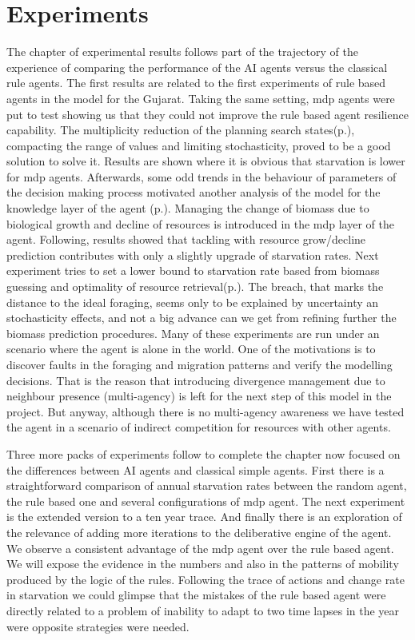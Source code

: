 \documentclass[11pt,oneside,a4paper,openright]{report}
\begin{document}
	
\chapter{Experiments}

The chapter of experimental results follows part of the trajectory of the experience of comparing the 
performance of the AI agents versus the classical rule agents. The first results are related to the first
experiments of rule based agents in the model for the Gujarat\cite{JARM2014}. Taking the same setting, 
mdp agents were put to test showing us that they could not improve the rule based agent resilience capability.  
The multiplicity reduction of the planning search states(p.\pageref{sec:ReduccStates}), compacting the range of values and 
limiting stochasticity, proved to be a good solution to solve it. Results are shown where it is obvious that 
starvation is lower for mdp agents. Afterwards, some odd trends in the behaviour of parameters of the decision 
making process motivated another analysis of the model for the knowledge layer of the agent 
(p.\pageref{sec:Divergence}). 
Managing the change of biomass due to biological growth and decline of resources is introduced in the mdp 
layer of the agent. Following, results showed that tackling with resource grow/decline prediction contributes 
with only a slightly upgrade of starvation rates. Next experiment tries to set a lower bound to starvation 
rate based from biomass guessing and optimality of resource retrieval(p.\pageref{sec:NoDepletionExperiment}). The breach, 
that marks the distance to the ideal foraging, seems only to be explained by uncertainty an stochasticity 
effects, and not a big advance can we get from refining further the biomass prediction procedures. Many of 
these experiments are run under an scenario where the agent is alone in the world. One of the motivations is 
to discover faults in the foraging and migration patterns and verify the modelling decisions.
That is the reason that introducing divergence management due to neighbour presence (multi-agency) is left 
for the next step of this model in the project. But anyway, although there is no multi-agency awareness we 
have tested the agent in a scenario of indirect competition for resources with other agents.

Three more packs of experiments follow to complete the chapter now focused on the differences between AI 
agents and classical simple agents. First there is a straightforward comparison of annual starvation rates
between the random agent, the rule based one and several configurations of mdp agent. The next experiment
is the extended version to a ten year trace. And finally there is an exploration of the relevance of adding 
more iterations to the deliberative engine of the agent. We observe a consistent advantage of the mdp agent
over the rule based agent. We will expose the evidence in the numbers and also in the patterns of mobility 
produced by the logic of the rules. Following the trace of actions and change rate in starvation we could 
glimpse that the mistakes of the rule based agent were directly related to a problem of inability to adapt 
to two time lapses in the year were opposite strategies were needed.
\end{document}
